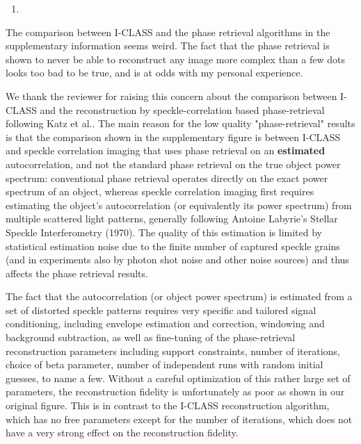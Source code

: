 \documentclass[12pt]{article}
\newenvironment{solved_reviewercomment}
    {\begin{tcolorbox}[width=\linewidth,colback=gray!5,colframe=solved_commentcolor!50,title=Reviewer Comment,left=5pt,right=5pt]}
    {\end{tcolorbox}}
\newenvironment{finished_ourresponse}
    {\begin{tcolorbox}[width=\linewidth,breakable,enhanced,colback=gray!5,colframe=finished_responsecolor!50,title=Response,left=5pt,right=5pt]}
    {\end{tcolorbox}}
\begin{document}
\begin{enumerate}[label=\arabic*., resume]
\item \leavevmode
\end{enumerate}
\vspace{-1em}
\begin{solved_reviewercomment}
    The comparison between I-CLASS and the phase retrieval algorithms in the supplementary information seems weird. The fact that the phase retrieval is shown to never be able to reconstruct any image more complex than a few dots looks too bad to be true, and is at odds with my personal experience.
\end{solved_reviewercomment}

\begin{finished_ourresponse}
        We thank the reviewer for raising this concern about the comparison between I-CLASS and the reconstruction by speckle-correlation based phase-retrieval following Katz et al.\cite{katz14}. The main reason for the low quality "phase-retrieval" results is that the comparison shown in the supplementary figure is between I-CLASS and speckle correlation imaging that uses phase retrieval on an \textbf{estimated} autocorrelation, and not the standard phase retrieval on the true object power spectrum: conventional phase retrieval operates directly on the exact power spectrum of an object, whereas speckle correlation imaging first requires estimating the object's autocorrelation (or equivalently its power spectrum) from multiple scattered light patterns, generally following Antoine Labyrie's Stellar Speckle Interferometry (1970)\cite{labeyrie1970attainment}. The quality of this estimation is limited by statistical estimation noise due to the finite number of captured speckle grains (and in experiments also by photon shot noise and other noise sources) and thus affects the phase retrieval results.

    The fact that the autocorrelation (or object power spectrum) is estimated from a set of distorted speckle patterns requires very specific and tailored signal conditioning, including envelope estimation and correction, windowing and background subtraction, as well as fine-tuning of the phase-retrieval reconstruction parameters including support constraints, number of iterations, choice of beta parameter, number of independent runs with random initial guesses, to name a few. Without a careful optimization of this rather large set of parameters, the reconstruction fidelity is unfortunately as poor as shown in our original figure. This is in contrast to the I-CLASS reconstruction algorithm, which has no free parameters except for the number of iterations, which does not have a very strong effect on the reconstruction fidelity.
    

\end{finished_ourresponse}
\end{document}
